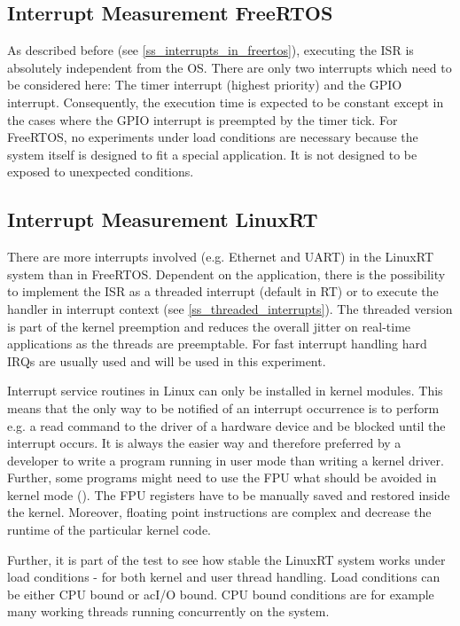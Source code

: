 \subsection{Interrupt Measurement FreeRTOS}
As described before (see \ref{ss_interrupts_in_freertos}), executing the \ac{ISR} is absolutely independent from the \ac{OS}.
There are only two interrupts which need to be considered here: The timer interrupt (highest priority) and the \ac{GPIO} interrupt.
Consequently, the execution time is expected to be constant except in the cases where the \ac{GPIO} interrupt is preempted by the timer tick.
For FreeRTOS, no experiments under load conditions are necessary because the system itself is designed to fit a special application.
It is not designed to be exposed to unexpected conditions. 

\subsection{Interrupt Measurement LinuxRT}
There are more interrupts involved (e.g. Ethernet and \ac{UART}) in the LinuxRT system than in FreeRTOS.
Dependent on the application, there is the possibility to implement the \ac{ISR} as a threaded interrupt (default in RT) or to execute the handler in interrupt context (see \ref{ss_threaded_interrupts}).
The threaded version is part of the kernel preemption and reduces the overall jitter on real-time applications as the threads are preemptable.
For fast interrupt handling hard \acp{IRQ} are usually used and will be used in this experiment. 
\par
Interrupt service routines in Linux can only be installed in kernel modules. 
This means that the only way to be notified of an interrupt occurrence is to perform e.g. a read command to the driver of a hardware device and be blocked until the interrupt occurs.
It is always the easier way and therefore preferred by a developer to write a program running in user mode than writing a kernel driver.
Further, some programs might need to use the \ac{FPU} what should be avoided in kernel mode (\cite{love:lkd}).
The \ac{FPU} registers have to be manually saved and restored inside the kernel.
Moreover, floating point instructions are complex and decrease the runtime of the particular kernel code. 
\par
Further, it is part of the test to see how stable the LinuxRT system works under load conditions - for both kernel and user thread handling.
Load conditions can be either \ac{CPU} bound or ac{I/O} bound. 
\ac{CPU} bound conditions are for example many working threads running concurrently on the system.
